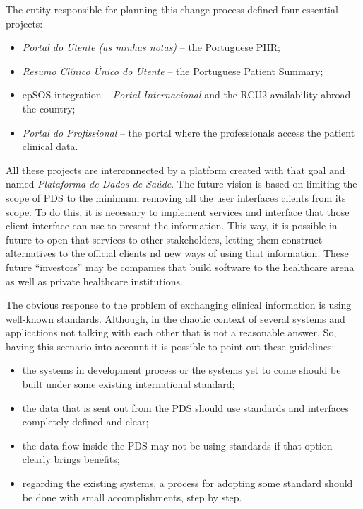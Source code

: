 
The entity responsible for planning this change process defined four essential projects:
\begin{itemize}
\item \textit{Portal do Utente (as minhas notas)} -- the Portuguese PHR;
\item \textit{Resumo Clínico Único do Utente} -- the Portuguese Patient Summary;
\item epSOS integration -- \textit{Portal Internacional} and the RCU2 availability abroad the country;
\item \textit{Portal do Profissional} -- the portal where the professionals access the patient clinical data.
\end{itemize}

All these projects are interconnected by a platform created with that goal and named \textit{Plataforma de Dados de Saúde}. The future vision is based on limiting the scope of PDS to the minimum, removing all the user interfaces clients from its scope. To do this, it is necessary to implement services and interface that those client interface can use to present the information. This way, it is possible in future to open that services to other stakeholders, letting them construct alternatives to the official clients nd new ways of using that information. These future ``investors'' may be companies that build software to the healthcare arena as well as private healthcare institutions.

The obvious response to the problem of exchanging clinical information is using well-known standards. Although, in the chaotic context of several systems and applications not talking with each other that is not a reasonable answer. So, having this scenario into account it is possible to point out these guidelines:
\begin{itemize}
\item the systems in development process or the systems yet to come should be built under some existing international standard;
\item the data that is sent out from the PDS should use standards and interfaces completely defined and clear;
\item the data flow inside the PDS may not be using standards if that option clearly brings benefits;
\item regarding the existing systems, a process for adopting some standard should be done with small accomplishments, step by step.
\end{itemize}

